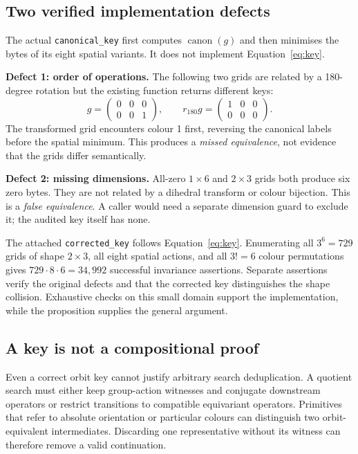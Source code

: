 \documentclass[10pt,a4paper]{article}
\begin{document}
\subsection{Two verified implementation defects}
The actual \texttt{canonical\_key} first computes $\operatorname{canon}(g)$ and then minimises the bytes of its eight spatial variants. It does not implement Equation~\ref{eq:key}.

\textbf{Defect 1: order of operations.} The following two grids are related by a 180-degree rotation but the existing function returns different keys:
\[
g=\begin{pmatrix}0&0&0\\0&0&1\end{pmatrix},\qquad
r_{180}g=\begin{pmatrix}1&0&0\\0&0&0\end{pmatrix}.
\]
The transformed grid encounters colour 1 first, reversing the canonical labels before the spatial minimum. This produces a \emph{missed equivalence}, not evidence that the grids differ semantically.

\textbf{Defect 2: missing dimensions.} All-zero $1\times6$ and $2\times3$ grids both produce six zero bytes. They are not related by a dihedral transform or colour bijection. This is a \emph{false equivalence}. A caller would need a separate dimension guard to exclude it; the audited key itself has none.

The attached \texttt{corrected\_key} follows Equation~\ref{eq:key}. Enumerating all $3^6=729$ grids of shape $2\times3$, all eight spatial actions, and all $3!=6$ colour permutations gives $729\cdot8\cdot6=34{,}992$ successful invariance assertions. Separate assertions verify the original defects and that the corrected key distinguishes the shape collision. Exhaustive checks on this small domain support the implementation, while the proposition supplies the general argument.

\subsection{A key is not a compositional proof}
Even a correct orbit key cannot justify arbitrary search deduplication. A quotient search must either keep group-action witnesses and conjugate downstream operators or restrict transitions to compatible equivariant operators. Primitives that refer to absolute orientation or particular colours can distinguish two orbit-equivalent intermediates. Discarding one representative without its witness can therefore remove a valid continuation.
\end{document}
